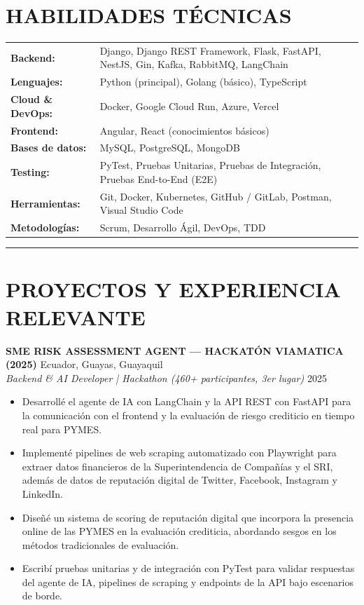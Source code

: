 \documentclass[11pt, a4paper]{article}
\begin{document}
\section*{HABILIDADES TÉCNICAS}
\vspace{-2pt}
\begin{tabular}{p{} p{}}
\textbf{Backend:} & Django, Django REST Framework, Flask, FastAPI, NestJS, Gin, Kafka, RabbitMQ, LangChain \\
\textbf{Lenguajes:} & Python (principal), Golang (básico), TypeScript \\
\textbf{Cloud \& DevOps:} & Docker, Google Cloud Run, Azure, Vercel \\
\textbf{Frontend:} & Angular, React (conocimientos básicos) \\
\textbf{Bases de datos:} & MySQL, PostgreSQL, MongoDB \\
\textbf{Testing:} & PyTest, Pruebas Unitarias, Pruebas de Integración, Pruebas End-to-End (E2E) \\
\textbf{Herramientas:} & Git, Docker, Kubernetes, GitHub / GitLab, Postman, Visual Studio Code \\
\textbf{Metodologías:} & Scrum, Desarrollo Ágil, DevOps, TDD \\
\end{tabular}
\vspace{6pt}
\hrule
\vspace{8pt}

\section*{PROYECTOS Y EXPERIENCIA RELEVANTE}

\textbf{SME RISK ASSESSMENT AGENT --- HACKATÓN VIAMATICA (2025)} \hfill Ecuador, Guayas, Guayaquil \\
\textit{Backend \& AI Developer | Hackathon (460+ participantes, 3er lugar)} \hfill 2025

\begin{itemize}
\item Desarrollé el agente de IA con LangChain y la API REST con FastAPI para la comunicación con el frontend y la evaluación de riesgo crediticio en tiempo real para PYMES.
\item Implementé pipelines de web scraping automatizado con Playwright para extraer datos financieros de la Superintendencia de Compañías y el SRI, además de datos de reputación digital de Twitter, Facebook, Instagram y LinkedIn.
\item Diseñé un sistema de scoring de reputación digital que incorpora la presencia online de las PYMES en la evaluación crediticia, abordando sesgos en los métodos tradicionales de evaluación.
\item Escribí pruebas unitarias y de integración con PyTest para validar respuestas del agente de IA, pipelines de scraping y endpoints de la API bajo escenarios de borde.
\end{itemize}
\end{document}
